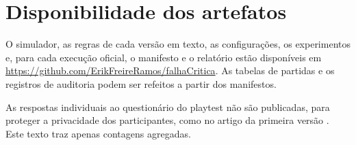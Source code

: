 \section*{Disponibilidade dos artefatos}

O simulador, as regras de cada versão em texto, as configurações, os experimentos e, para cada execução
oficial, o manifesto e o relatório estão disponíveis em \url{https://github.com/ErikFreireRamos/falhaCritica}. As
tabelas de partidas e os registros de auditoria podem ser refeitos a partir dos manifestos.

As respostas individuais ao questionário do playtest não são publicadas, para proteger a privacidade dos
participantes, como no artigo da primeira versão \cite{oliveira2025critical}. Este texto traz apenas contagens
agregadas.
